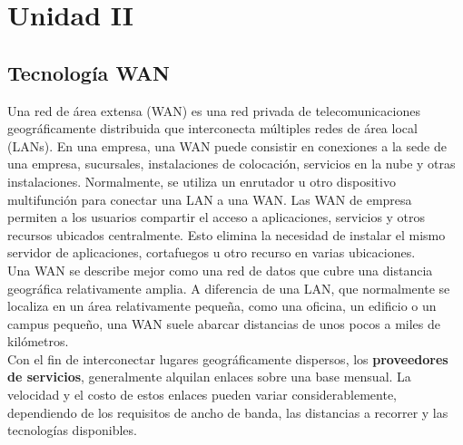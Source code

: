 \documentclass[
	12pt, %
	fleqn, %
	a4paper, %
	oneside, %
]{LegrandOrangeBook}
\begin{document}
\chapter{Unidad II}
\section{Tecnología WAN}
Una red de área extensa (WAN) es una red privada de telecomunicaciones geográficamente distribuida que interconecta múltiples redes de área local (LANs). En una empresa, una WAN puede consistir en conexiones a la sede de una empresa, sucursales, instalaciones de colocación, servicios en la nube y otras instalaciones. Normalmente, se utiliza un enrutador u otro dispositivo multifunción para conectar una LAN a una WAN. Las WAN de empresa permiten a los usuarios compartir el acceso a aplicaciones, servicios y otros recursos ubicados centralmente. Esto elimina la necesidad de instalar el mismo servidor de aplicaciones, cortafuegos u otro recurso en varias ubicaciones.\\
Una WAN se describe mejor como una red de datos que cubre una distancia geográfica relativamente amplia. A diferencia de una LAN, que normalmente se localiza en un área relativamente pequeña, como una oficina, un edificio o un campus pequeño, una WAN suele abarcar distancias de unos pocos a miles de kilómetros.\\
Con el fin de interconectar lugares geográficamente dispersos, los \textbf{proveedores de servicios}, generalmente alquilan enlaces sobre una base mensual. La velocidad y el costo de estos enlaces pueden variar considerablemente, dependiendo de los requisitos de ancho de banda, las distancias a recorrer y las tecnologías disponibles.
\end{document}

